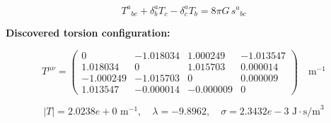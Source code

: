 
\begin{equation}
  T^a{}_{bc} + \delta^a_b T_c - \delta^a_c T_b = 8\pi G \, s^a{}_{bc}
\end{equation}

\textbf{Discovered torsion configuration:}

\begin{equation}
  T^{\mu\nu} = \begin{pmatrix}
    0 & -1.018034 & 1.000249 & -1.013547 \\
    1.018034 & 0 & 1.015703 & 0.000014 \\
    -1.000249 & -1.015703 & 0 & 0.000009 \\
    1.013547 & -0.000014 & -0.000009 & 0
  \end{pmatrix} \quad \text{m}^{-1}
\end{equation}

\begin{equation}
  |T| = 2.0238e+0 \text{ m}^{-1}, \quad
  \lambda = -9.8962, \quad
  \sigma = 2.3432e-3 \text{ J}\cdot\text{s/m}^3
\end{equation}